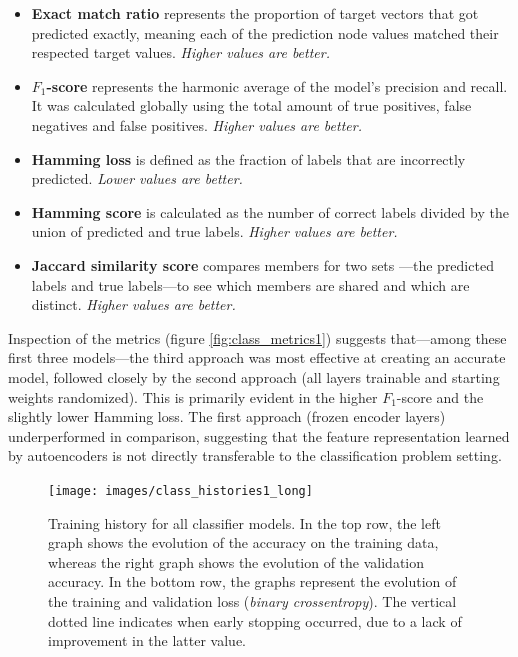 \begin{itemize}
 	\item{\textbf{Exact match ratio} represents the proportion of target vectors that got predicted exactly, meaning each of the prediction node values matched their respected target values. \textit{Higher values are better.}}
	\item{\textbf{$F_1$-score} represents the harmonic average of the model's precision and recall. It was calculated globally using the total amount of true positives, false negatives and false positives. \textit{Higher values are better.}}
	\item{\textbf{Hamming loss} is defined as the fraction of labels that are incorrectly predicted. \textit{Lower values are better.}}
	\item{\textbf{Hamming score} is calculated as the number of correct labels divided by the union of predicted and true labels. \textit{Higher values are better.}}
	\item{\textbf{Jaccard similarity score} compares members for two sets ---the predicted labels and true labels---to see which members are shared and which are distinct. \textit{Higher values are better.}}
\end{itemize}

Inspection of the metrics (figure \ref{fig:class_metrics1}) suggests that---among these first three models---the third approach was most effective at creating an accurate model, followed closely by the second approach (all layers trainable and starting weights randomized). This is primarily evident in the higher $F_1$-score and the slightly lower Hamming loss.  The first approach (frozen encoder layers) underperformed in comparison, suggesting that the feature representation learned by autoencoders is not directly transferable to the classification problem setting.

\begin{figure}[!htbp]
	\begin{center}
		\texttt{[image: images/class\_histories1\_long]}
		\caption{Training history for all classifier models. In the top row, the left graph shows the evolution of the accuracy on the training data, whereas the right graph shows the evolution of the validation accuracy. In the bottom row, the graphs represent the evolution of the training and validation loss (\textit{binary crossentropy}). The vertical dotted line indicates when early stopping occurred, due to a lack of improvement in the latter value.}
		\label{fig:class_histories1_long}
	\end{center}
\end{figure}



